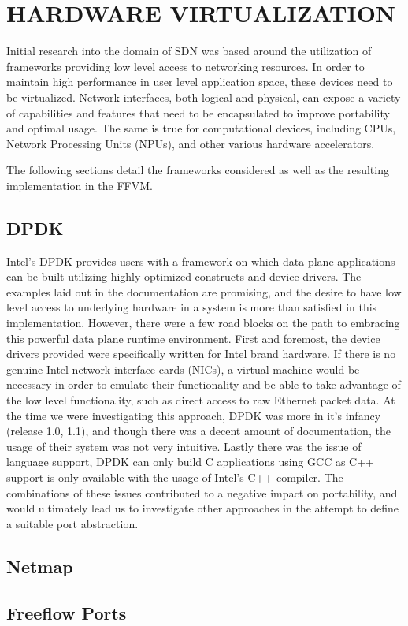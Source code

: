 \chapter{HARDWARE VIRTUALIZATION}
\label{hardware}
Initial research into the domain of SDN was based around the utilization
of frameworks providing low level access to networking resources. In order
to maintain high performance in user level application space, these devices
need to be virtualized. Network interfaces, both logical and physical, can 
expose a variety of capabilities and features that need to be encapsulated
to improve portability and optimal usage. The same is true for computational
devices, including CPUs, Network Processing Units (NPUs), and other various
hardware accelerators. 

The following sections detail the frameworks considered as well as the 
resulting implementation in the FFVM.

\section{DPDK}
\label{hardware:dpdk}
Intel's DPDK provides users with a framework on which data plane
applications can be built utilizing highly optimized constructs and
device drivers. The examples laid out in the documentation are
promising, and the desire to have low level access to underlying
hardware in a system is more than satisfied in this implementation.
However, there were a few road blocks on the path to embracing this
powerful data plane runtime environment. First and foremost, the
device drivers provided were specifically written for Intel brand
hardware. If there is no genuine Intel network interface cards
(NICs), a virtual machine would be necessary in order to emulate
their functionality and be able to take advantage of the low level
functionality, such as direct access to raw Ethernet packet data.
At the time we were investigating this approach, DPDK was more in
it's infancy (release 1.0, 1.1), and though there was a decent amount
of documentation, the usage of their system was not very intuitive.
Lastly there was the issue of language support, DPDK can only build
C applications using GCC as C++ support is only available with the
usage of Intel's C++ compiler. The combinations of these issues
contributed to a negative impact on portability, and would ultimately
lead us to investigate other approaches in the attempt to define
a suitable port abstraction.

\section{Netmap}
\label{hardware:netmap}

\section{Freeflow Ports}
\label{hardware:ffports}
